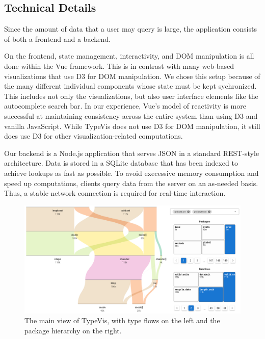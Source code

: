 \documentclass{vgtc}                          %
\begin{document}
\subsection{Technical Details}

Since the amount of data that a user may query is large,
the application consists of both a frontend and a backend.

On the frontend, state management, interactivity,
and DOM manipulation is all done within the Vue framework.
This is in contrast with many web-based visualizations
that use D3 for DOM manipulation.
We chose this setup because of the many different
individual components whose state must be kept
sychronized.
This includes not only the visualizations, but also
user interface elements like the autocomplete search bar.
In our experience, Vue's model of reactivity is
more successful at maintaining consistency across the
entire system than using D3 and vanilla JavaScript.
While {\sc TypeVis} does not use D3 for DOM manipulation,
it still does use D3 for other visualization-related
computations.

Our backend is a Node.js application that serves
JSON in a standard REST-style architecture.
Data is stored in a SQLite database that has been
indexed to achieve lookups as fast as possible.
To avoid execessive memory consumption and speed up computations,
clients query data from the server on an as-needed basis.
Thus, a stable network connection is required for
real-time interaction.

\begin{figure}
 \centering
 \includegraphics[width=\linewidth]{img/typevis.png}
 \caption{The main view of {\sc TypeVis}, with type flows on the left and the package hierarchy on the right.}
 \label{fig:typevis}
\end{figure}
\end{document}
